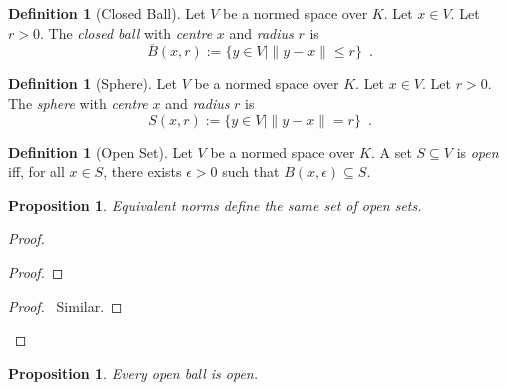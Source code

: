 \documentclass{book}
\let\qed\relax
\newtheorem{prop}[ax]{Proposition}
\theoremstyle{definition}
\newtheorem{df}[ax]{Definition}
\begin{document}
\begin{df}[Closed Ball]
Let $V$ be a normed space over $K$. Let $x \in V$. Let $r > 0$. The \emph{closed ball} with \emph{centre} $x$ and \emph{radius} $r$ is
\[ \overline{B}(x,r) := \{ y \in V \mid \| y-x\| \leq r \} \enspace . \]
\end{df}

\begin{df}[Sphere]
Let $V$ be a normed space over $K$. Let $x \in V$. Let $r > 0$. The \emph{sphere} with \emph{centre} $x$ and \emph{radius} $r$ is
\[ S(x,r) := \{ y \in V \mid \| y-x\| = r \} \enspace . \]
\end{df}

\begin{df}[Open Set]
Let $V$ be a normed space over $K$. A set $S \subseteq V$ is \emph{open} iff, for all $x \in S$, there exists $\epsilon > 0$ such that $B(x,\epsilon) \subseteq S$.
\end{df}

\begin{prop}
Equivalent norms define the same set of open sets.
\end{prop}

\begin{proof}
\pf
{}
\begin{proof}
\end{proof}
\begin{proof}
	\pf\ Similar.
\end{proof}
\qed
\end{proof}

\begin{prop}
Every open ball is open.
\end{prop}
\end{document}
